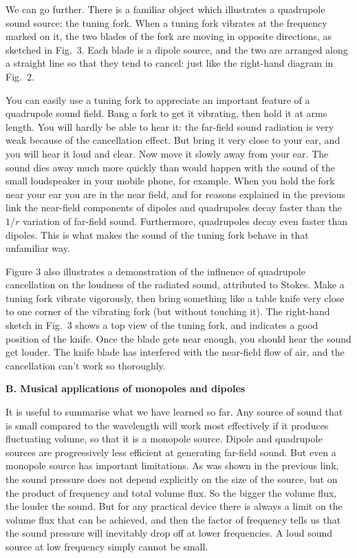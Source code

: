   We can go further. There is a familiar object which illustrates a quadrupole 
  sound source: the tuning fork. When a tuning fork vibrates at the frequency 
  marked on it, the two blades of the fork are moving in opposite directions, 
  as sketched in Fig.\ 3. Each blade is a dipole source, and the two are 
  arranged along a straight line so that they tend to cancel: just like the 
  right-hand diagram in Fig.\ 2. 


  You can easily use a tuning fork to appreciate an important feature of a 
  quadrupole sound field. Bang a fork to get it vibrating, then hold it at arms 
  length. You will hardly be able to hear it: the far-field sound radiation is 
  very weak because of the cancellation effect. But bring it very close to your 
  ear, and you will hear it loud and clear. Now move it slowly away from your 
  ear. The sound dies away much more quickly than would happen with the sound 
  of the small loudspeaker in your mobile phone, for example. When you hold the 
  fork near your ear you are in the near field, and for reasons explained in 
  the previous link the near-field components of dipoles and quadrupoles decay 
  faster than the $1/r$ variation of far-field sound. Furthermore, quadrupoles 
  decay even faster than dipoles. This is what makes the sound of the tuning 
  fork behave in that unfamiliar way. 

  Figure 3 also illustrates a demonstration of the influence of quadrupole 
  cancellation on the loudness of the radiated sound, attributed to Stokes. 
  Make a tuning fork vibrate vigorously, then bring something like a table 
  knife very close to one corner of the vibrating fork (but without touching 
  it). The right-hand sketch in Fig.\ 3 shows a top view of the tuning fork, 
  and indicates a good position of the knife. Once the blade gets near enough, 
  you should hear the sound get louder. The knife blade has interfered with the 
  near-field flow of air, and the cancellation can't work so thoroughly. 

  \textbf{B. Musical applications of monopoles and dipoles} 

  It is useful to summarise what we have learned so far. Any source of sound 
  that is small compared to the wavelength will work most effectively if it 
  produces fluctuating volume, so that it is a monopole source. Dipole and 
  quadrupole sources are progressively less efficient at generating far-field 
  sound. But even a monopole source has important limitations. As was shown in 
  the previous link, the sound pressure does not depend explicitly on the size 
  of the source, but on the product of frequency and total volume flux. So the 
  bigger the volume flux, the louder the sound. But for any practical device 
  there is always a limit on the volume flux that can be achieved, and then the 
  factor of frequency tells us that the sound pressure will inevitably drop off 
  at lower frequencies. A loud sound source at low frequency simply cannot be 
  small. 

